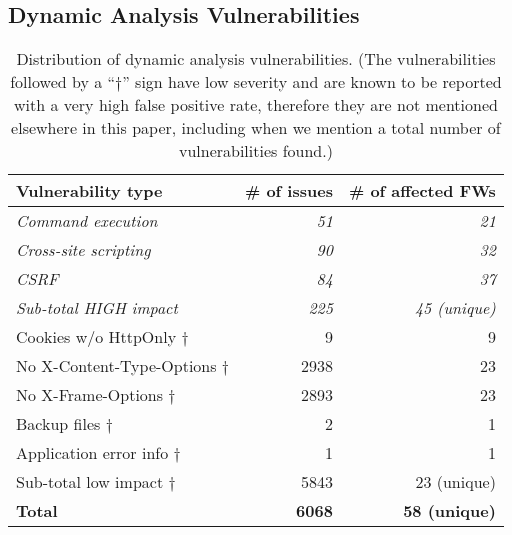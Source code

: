 \documentclass[conference]{./templates/ndss/IEEEtran}
\newcounter{t0d0_counter}
\newcounter{pr00f_counter}
\newcommand{\CountFirmwareDynVulnTotal}{58}
\newcommand{\CountFirmwareDynVulnTotalHigh}{45} \newcommand{\CountFirmwareDynVulnTotalLow}{23} \newcommand{\CountFirmwareDynVulnCmdInj}{21}
\newcommand{\CountFirmwareDynVulnXSS}{32}
\newcommand{\CountFirmwareDynVulnCSRF}{37}
\newcommand{\CountFirmwareDynVulnBackup}{1}
\newcommand{\countfirmwaredynvulncookiehttp}{9}
\newcommand{\countfirmwaredynvulnxcontenttype}{23}
\newcommand{\countfirmwaredynvulnxframeoptions}{23}
\newcommand{\CountFirmwareDynVulnErrorDiscl}{1}
\newcommand{\CountDynVulnsTotal}{6068} \newcommand{\CountDynVulnsTotalHigh}{225}
\newcommand{\CountDynVulnsTotalLow}{5843} \newcommand{\CountDynVulnsCmdInj}{51} \newcommand{\CountDynVulnsXSS}{90}
\newcommand{\CountDynVulnsCSRF}{84}
\newcommand{\CountDynVulnsBackup}{2}
\newcommand{\countdynvulncookiehttp}{9}
\newcommand{\countdynvulnxcontenttype}{2938}
\newcommand{\countdynvulnxframeoptions}{2893}
\newcommand{\CountDynVulnAppErrorDiscl}{1}
\begin{document}
\subsection{Dynamic Analysis Vulnerabilities}



\begin{table}[t]
\centering
\caption{
  Distribution of dynamic analysis vulnerabilities. 
  (The vulnerabilities
  followed by a ``$\dag$'' sign have low severity and are known to be reported
  with a very high false positive rate, therefore they are not mentioned elsewhere
  in this paper, including when we mention a total number of vulnerabilities found.) 
  }
\begin{tabular}{lrr}\\
\toprule
\textbf{Vulnerability type} & \textbf{\# of issues} & \textbf{\# of affected FWs} \\\midrule

\emph{Command execution}        & \emph{\CountDynVulnsCmdInj{}}     & \emph{\CountFirmwareDynVulnCmdInj{}}   \\\emph{Cross-site scripting}     & \emph{\CountDynVulnsXSS{}}        & \emph{\CountFirmwareDynVulnXSS{}}      \\\emph{CSRF}                     & \emph{\CountDynVulnsCSRF{}}       & \emph{\CountFirmwareDynVulnCSRF{}}     \\

\midrule
\emph{Sub-total HIGH impact}          & \emph{\CountDynVulnsTotalHigh{}}      & \emph{\CountFirmwareDynVulnTotalHigh{} (unique)}  \\\midrule

Cookies w/o HttpOnly      $\dag$      & \countdynvulncookiehttp                    & \countfirmwaredynvulncookiehttp                            \\No X-Content-Type-Options $\dag$      & \countdynvulnxcontenttype                    & \countfirmwaredynvulnxcontenttype                    \\No X-Frame-Options  $\dag$            & \countdynvulnxframeoptions                    & \countfirmwaredynvulnxframeoptions                      \\Backup files  $\dag$                  & \CountDynVulnsBackup                    & \CountFirmwareDynVulnBackup                      \\Application error info $\dag$         & \CountDynVulnAppErrorDiscl                    & \CountFirmwareDynVulnErrorDiscl                      \\

\midrule
Sub-total low impact $\dag$           & \CountDynVulnsTotalLow{}      & \CountFirmwareDynVulnTotalLow{} (unique)  \\\midrule

\textbf{Total}          & \textbf{\CountDynVulnsTotal{}}      & \textbf{\CountFirmwareDynVulnTotal{} (unique)}  \\

\bottomrule
\end{tabular}
\label{tbl:vulns-dynamic}
\end{table}
\end{document}

